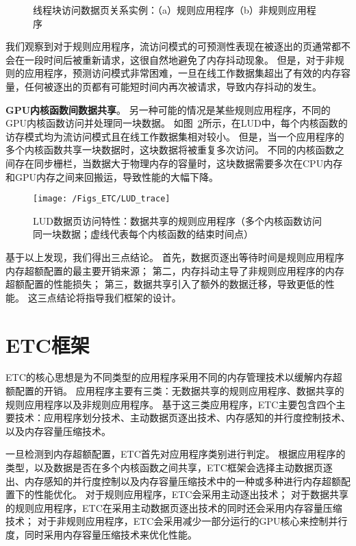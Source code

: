\begin{figure}[htb]
\centering
{} \qquad
{} 
\caption{线程块访问数据页关系实例：（a）规则应用程序（b）非规则应用程序}
\label{fig:Trace_2}
\end{figure}

我们观察到对于规则应用程序，流访问模式的可预测性表现在被逐出的页通常都不会在一段时间后被重新请求，这很自然地避免了内存抖动现象。
但是，对于非规则的应用程序，预测访问模式非常困难，一旦在线工作数据集超出了有效的内存容量，任何被逐出的页都有可能短时间内再次被请求，导致内存抖动的发生。

\textbf{GPU内核函数间数据共享}。
另一种可能的情况是某些规则应用程序，不同的GPU内核函数访问并处理同一块数据。
如图~\ref{fig:LUD_trace}所示，在LUD中，每个内核函数的访存模式均为流访问模式且在线工作数据集相对较小。
但是，当一个应用程序的多个内核函数共享一块数据时，这块数据将被重复多次访问。
不同的内核函数之间存在同步栅栏，当数据大于物理内存的容量时，这块数据需要多次在CPU内存和GPU内存之间来回搬运，导致性能的大幅下降。


\begin{figure}[htbp] %
  \centering
  \texttt{[image: /Figs\_ETC/LUD\_trace]}
  \caption{LUD数据页访问特性：数据共享的规则应用程序（多个内核函数访问同一块数据；虚线代表每个内核函数的结束时间点）}
  \label{fig:LUD_trace}
\end{figure}

基于以上发现，我们得出三点结论。
首先，数据页逐出等待时间是规则应用程序内存超额配置的最主要开销来源；
第二，内存抖动主导了非规则应用程序的内存超额配置的性能损失；
第三，数据共享引入了额外的数据迁移，导致更低的性能。
这三点结论将指导我们框架的设计。

\section{ETC框架}
ETC的核心思想是为不同类型的应用程序采用不同的内存管理技术以缓解内存超额配置的开销。
应用程序主要有三类：无数据共享的规则应用程序、数据共享的规则应用程序以及非规则应用程序。
基于这三类应用程序，ETC主要包含四个主要技术：应用程序划分技术、主动数据页逐出技术、内存感知的并行度控制技术、以及内存容量压缩技术。

一旦检测到内存超额配置，ETC首先对应用程序类别进行判定。
根据应用程序的类型，以及数据是否在多个内核函数之间共享，ETC框架会选择主动数据页逐出、内存感知的并行度控制以及内存容量压缩技术中的一种或多种进行内存超额配置下的性能优化。
对于规则应用程序，ETC会采用主动逐出技术；
对于数据共享的规则应用程序，ETC在采用主动数据页逐出技术的同时还会采用内存容量压缩技术；
对于非规则应用程序，ETC会采用减少一部分运行的GPU核心来控制并行度，同时采用内存容量压缩技术来优化性能。

